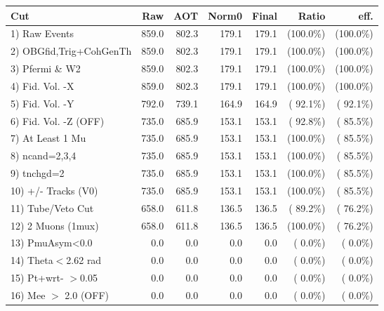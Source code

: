  \begin{table}[h!]\centering
 \begin{tabular}{||l||r|r|r|r|r|r||}
 \hline
 \hline
 Cut & Raw & AOT & Norm0 & Final & Ratio & eff.       \\
 \hline
  1) Raw Events           &        859.0 &        802.3 &        179.1 &        179.1 & (100.0\%) & (100.0\%) \\
  2) OBGfid,Trig+CohGenTh &        859.0 &        802.3 &        179.1 &        179.1 & (100.0\%) & (100.0\%) \\
  3) Pfermi \& W2         &        859.0 &        802.3 &        179.1 &        179.1 & (100.0\%) & (100.0\%) \\
  4) Fid. Vol. -X         &        859.0 &        802.3 &        179.1 &        179.1 & (100.0\%) & (100.0\%) \\
  5) Fid. Vol. -Y         &        792.0 &        739.1 &        164.9 &        164.9 & ( 92.1\%) & ( 92.1\%) \\
  6) Fid. Vol. -Z (OFF)   &        735.0 &        685.9 &        153.1 &        153.1 & ( 92.8\%) & ( 85.5\%) \\
  7) At Least 1 Mu        &        735.0 &        685.9 &        153.1 &        153.1 & (100.0\%) & ( 85.5\%) \\
  8) ncand=2,3,4          &        735.0 &        685.9 &        153.1 &        153.1 & (100.0\%) & ( 85.5\%) \\
  9) tnchgd=2             &        735.0 &        685.9 &        153.1 &        153.1 & (100.0\%) & ( 85.5\%) \\
 10) +/- Tracks (V0)      &        735.0 &        685.9 &        153.1 &        153.1 & (100.0\%) & ( 85.5\%) \\
 11) Tube/Veto Cut        &        658.0 &        611.8 &        136.5 &        136.5 & ( 89.2\%) & ( 76.2\%) \\
 12) 2 Muons (1mux)       &        658.0 &        611.8 &        136.5 &        136.5 & (100.0\%) & ( 76.2\%) \\
 13) PmuAsym<0.0          &          0.0 &          0.0 &          0.0 &          0.0 & (  0.0\%) & (  0.0\%) \\
 14) Theta$<$2.62 rad     &          0.0 &          0.0 &          0.0 &          0.0 & (  0.0\%) & (  0.0\%) \\
 15) Pt+wrt- $>$0.05      &          0.0 &          0.0 &          0.0 &          0.0 & (  0.0\%) & (  0.0\%) \\
 16) Mee $>$ 2.0  (OFF)   &          0.0 &          0.0 &          0.0 &          0.0 & (  0.0\%) & (  0.0\%) \\

\end{tabular}
\end{table}
